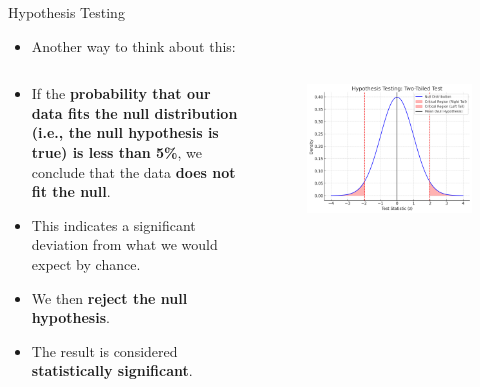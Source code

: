 \documentclass[
  ignorenonframetext,
]{beamer}
\providecommand{\tightlist}{%
  \setlength{\itemsep}{0pt}\setlength{\parskip}{0pt}}
\begin{document}
\begin{frame}{Hypothesis Testing}
\label{hypothesis-testing-2}
\begin{itemize}
\tightlist
\item
  Another way to think about this:
\end{itemize}

\begin{columns}[T]
\begin{column}{0.48\textwidth}
\small

\begin{itemize}
\tightlist
\item
  If the \textbf{probability that our data fits the null distribution
  (i.e., the null hypothesis is true) is less than 5\%}, we conclude
  that the data \textbf{does not fit the null}.
\item
  This indicates a significant deviation from what we would expect by
  chance.
\item
  We then \textbf{reject the null hypothesis}.
\item
  The result is considered \textbf{statistically significant}.\\
\end{itemize}
\end{column}

\begin{column}{0.48\textwidth}
\begin{figure}

{\centering \includegraphics[width=0.8\linewidth]{figs/plot1} 

}

\end{figure}
\end{column}
\end{columns}
\end{frame}
\end{document}
